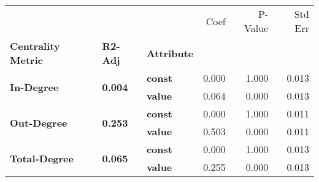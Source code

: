\begin{tabular}{lllrrr}
\toprule
             &       &       &  Coef &  P-Value &  Std Err \\
\textbf{Centrality Metric} & \textbf{R2-Adj} & \textbf{Attribute} &       &          &          \\
\midrule
\multirow{2}{*}{\textbf{In-Degree}} & \multirow{2}{*}{\textbf{0.004}} & \textbf{const} & 0.000 &    1.000 &    0.013 \\
             &       & \textbf{value} & 0.064 &    0.000 &    0.013 \\
\cline{1-6}
\cline{2-6}
\multirow{2}{*}{\textbf{Out-Degree}} & \multirow{2}{*}{\textbf{0.253}} & \textbf{const} & 0.000 &    1.000 &    0.011 \\
             &       & \textbf{value} & 0.503 &    0.000 &    0.011 \\
\cline{1-6}
\cline{2-6}
\multirow{2}{*}{\textbf{Total-Degree}} & \multirow{2}{*}{\textbf{0.065}} & \textbf{const} & 0.000 &    1.000 &    0.013 \\
             &       & \textbf{value} & 0.255 &    0.000 &    0.013 \\
\bottomrule
\end{tabular}
